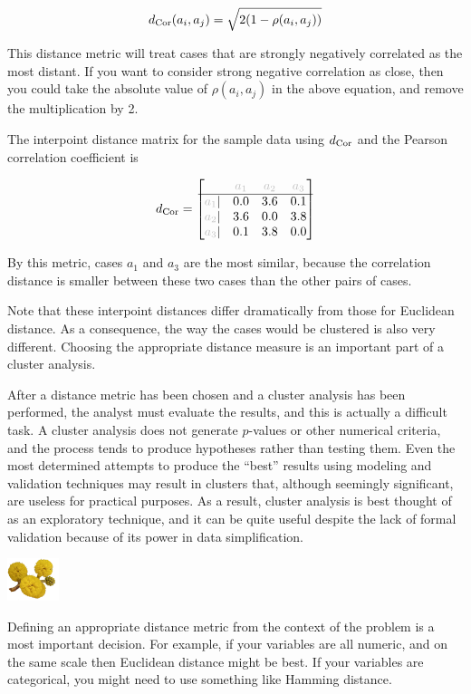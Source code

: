 \documentclass[
  letterpaper,
]{krantz}
\newcommand{\infobox}[1]{%
\noindent\colorbox{info!30}{%
\begin{minipage}{0.98\linewidth}%
    \centering%
    \begin{minipage}[c]{0.15\linewidth} %
      \includegraphics[width=1.5cm]{images/mulga-flowers2.png} %
    \end{minipage}%
    \hfill %
    \begin{minipage}[c]{0.8\linewidth} %
      \bigskip%
      \textsf{#1}%
      \bigskip%
    \end{minipage}%
    \hspace*{3mm}%
  \end{minipage}%
}%
}
\begin{document}
\begin{align*}
d_{\rm Cor}(a_i,a_j) = \sqrt{2(1-\rho(a_i,a_j))}
\end{align*}

This distance metric will treat cases that are strongly negatively
correlated as the most distant. If you want to consider strong negative
correlation as close, then you could take the absolute value of
\(\rho(a_i,a_j)\) in the above equation, and remove the multiplication
by 2.

The interpoint distance matrix for the sample data using \(d_{\rm Cor}\)
and the Pearson correlation coefficient is

\begin{align*}
d_{\rm Cor} = \begin{bmatrix}
& {\color{grey} a_1} & {\color{grey} a_2} & {\color{grey} a_3} \\\hline
{\color{grey} a_1} | & 0.0 & 3.6 & 0.1 \\
{\color{grey} a_2} | & 3.6 & 0.0 & 3.8 \\
{\color{grey} a_3} | & 0.1 & 3.8 & 0.0
\end{bmatrix}
\end{align*}

\noindent By this metric, cases \(a_1\) and \(a_3\) are the most
similar, because the correlation distance is smaller between these two
cases than the other pairs of cases.

Note that these interpoint distances differ dramatically from those for
Euclidean distance. As a consequence, the way the cases would be
clustered is also very different. Choosing the appropriate distance
measure is an important part of a cluster analysis.

After a distance metric has been chosen and a cluster analysis has been
performed, the analyst must evaluate the results, and this is actually a
difficult task. A cluster analysis does not generate \(p\)-values or
other numerical criteria, and the process tends to produce hypotheses
rather than testing them. Even the most determined attempts to produce
the ``best'' results using modeling and validation techniques may result
in clusters that, although seemingly significant, are useless for
practical purposes. As a result, cluster analysis is best thought of as
an exploratory technique, and it can be quite useful despite the lack of
formal validation because of its power in data simplification.

\infobox{Defining an appropriate distance metric from the context of the problem is a most important decision. For example, if your variables are all numeric, and on the same scale then Euclidean distance might be best. If your variables are categorical, you might need to use something like Hamming distance.}
\end{document}
